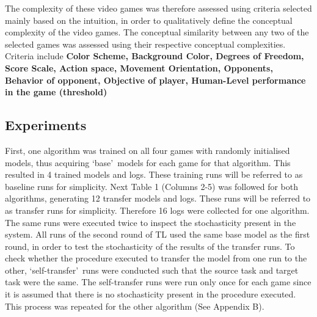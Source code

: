 The complexity of these video games was therefore assessed using criteria selected mainly based on the intuition, in order to qualitatively define the conceptual complexity of the video games. The conceptual similarity between any two of the selected games was assessed using their respective conceptual complexities. Criteria include \textbf{Color Scheme, Background Color, Degrees of Freedom, Score Scale, Action space, Movement Orientation, Opponents, Behavior of opponent, Objective of player, Human-Level performance in the game (threshold)} 

\subsection*{Experiments}
First, one algorithm was trained on all four games with randomly initialised models, thus acquiring \lq base\rq \ models for each game for that algorithm. This resulted in 4 trained models and logs. These training runs will be referred to as baseline runs for simplicity. Next Table 1 (Columns 2-5) was followed for both algorithms, generating 12 transfer models and logs. These runs will be referred to as transfer runs for simplicity. Therefore 16 logs were collected for one algorithm. The same runs were executed twice to inspect the stochasticity present in the system. All runs of the second round of TL used the same base model as the first round, in order to test the stochasticity of the results of the transfer runs. To check whether the procedure executed to transfer the model from one run to the other, \lq self-transfer\rq \ runs were conducted such that the source task and target task were the same. The self-transfer runs were run only once for each game since it is assumed that there is no stochasticity present in the procedure executed. This process was repeated for the other algorithm (See Appendix B). 

